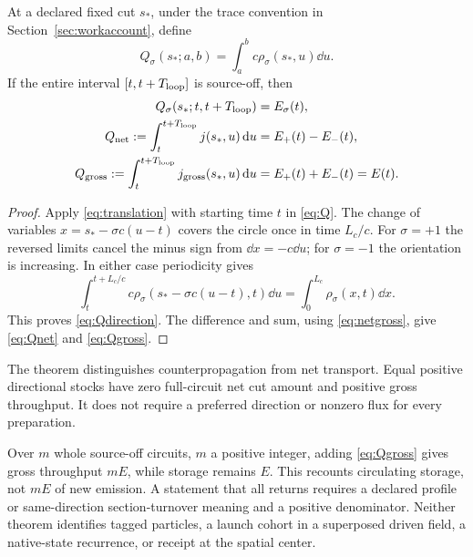 \begin{theorem}\label{thm:throughput}
At a declared fixed cut $s_*$, under the trace convention in Section~\ref{sec:workaccount}, define
\begin{equation}\label{eq:Q}
 Q_\sigma(s_*;a,b)=\int_a^b c\rho_\sigma(s_*,u)\dd u.
\end{equation}
If the entire interval $[t,t+T_{\rm loop}]$ is source-off, then
\begin{align}
 Q_\sigma(s_*;t,t+T_{\rm loop})&=E_\sigma(t),\label{eq:Qdirection}\\
 Q_{\rm net}:=\int_t^{t+T_{\rm loop}}j(s_*,u)\,\mathrm d u
 &=E_+(t)-E_-(t),\label{eq:Qnet}\\
 Q_{\rm gross}:=\int_t^{t+T_{\rm loop}}j_{\rm gross}(s_*,u)\,\mathrm d u
 &=E_+(t)+E_-(t)=E(t).\label{eq:Qgross}
\end{align}
\end{theorem}
\begin{proof}
Apply \eqref{eq:translation} with starting time $t$ in \eqref{eq:Q}. The change of variables $x=s_*-\sigma c(u-t)$ covers the circle once in time $L_c/c$. For $\sigma=+1$ the reversed limits cancel the minus sign from $\dd x=-c\dd u$; for $\sigma=-1$ the orientation is increasing. In either case periodicity gives
\[
 \int_t^{t+L_c/c}c\rho_\sigma(s_*-\sigma c(u-t),t)\dd u
 =\int_0^{L_c}\rho_\sigma(x,t)\dd x.
\]
This proves \eqref{eq:Qdirection}. The difference and sum, using \eqref{eq:netgross}, give \eqref{eq:Qnet} and \eqref{eq:Qgross}.
\end{proof}

The theorem distinguishes counterpropagation from net transport. Equal positive directional stocks have zero full-circuit net cut amount and positive gross throughput. It does not require a preferred direction or nonzero flux for every preparation.

Over $m$ whole source-off circuits, $m$ a positive integer, adding \eqref{eq:Qgross} gives gross throughput $mE$, while storage remains $E$. This recounts circulating storage, not $mE$ of new emission. A statement that all returns requires a declared profile or same-direction section-turnover meaning and a positive denominator. Neither theorem identifies tagged particles, a launch cohort in a superposed driven field, a native-state recurrence, or receipt at the spatial center.

